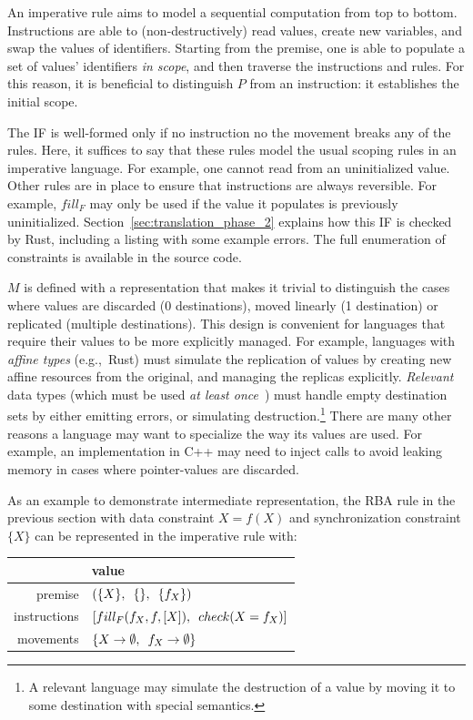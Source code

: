 An imperative rule aims to model a sequential computation from top to bottom. Instructions are able to (non-destructively) read values, create new variables, and swap the values of identifiers. Starting from the premise, one is able to populate a set of values' identifiers \textit{in scope}, and then traverse the instructions and rules. For this reason, it is beneficial to distinguish $P$ from an instruction: it establishes the initial scope.

The IF is well-formed only if no instruction no the movement breaks any of the rules. Here, it suffices to say that these rules model the usual scoping rules in an imperative language. For example, one cannot read from an uninitialized value. Other rules are in place to ensure that instructions are always reversible. For example, $fill_F$ may only be used if the value it populates is previously uninitialized. Section~\ref{sec:translation_phase_2} explains how this IF is checked by Rust, including a listing with some example errors. The full enumeration of constraints is available in the source code.

$M$ is defined with a representation that makes it trivial to distinguish the cases where values are discarded (0 destinations), moved linearly (1 destination) or replicated (multiple destinations). This design is convenient for languages that require their values to be more explicitly managed. For example, languages with \textit{affine types} (e.g.,\ Rust) must simulate the replication of values by creating new affine resources from the original, and managing the replicas explicitly.  \textit{Relevant} data types (which must be used \textit{at least once}~\cite{walker2005substructural}) must handle empty destination sets by either emitting errors, or simulating destruction.\footnote{A relevant language may simulate the destruction of a value by moving it to some  destination with special semantics.} There are many other reasons a language may want to specialize the way its values are used. For example, an implementation in C++ may need to inject  calls to avoid leaking memory in cases where pointer-values are discarded.

As an example to demonstrate intermediate representation, the RBA rule in the previous section with data constraint $X=f(X)$
and synchronization constraint $\{X\}$ can be represented in the imperative rule with:

\vspace{1em}
\noindent{}
\begin{tabular}{r|l}
	\centering
	&  value \\ \hline
	premise	&  $(\{X\}, \enskip\{\}, \enskip\{f_X\})$ \\
	instructions	& $[fill_F(f_X, f, [X]), \enskip{} check(X = f_X)]$ \\
	movements	& $\{X \rightarrow{}\emptyset{}, \enskip f_X \rightarrow{}\emptyset{}\}$ 
\end{tabular}
\vspace{1em}

